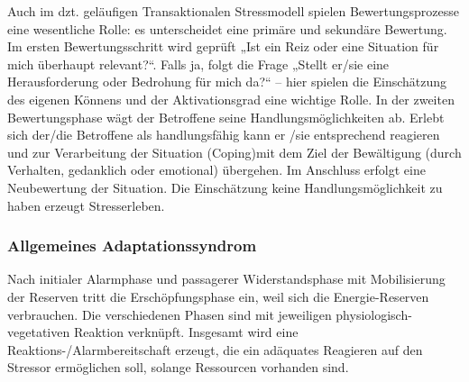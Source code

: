 Auch im dzt. geläufigen Transaktionalen Stressmodell spielen Bewertungsprozesse eine wesentliche Rolle: es unterscheidet eine primäre und sekundäre Bewertung. Im ersten Bewertungsschritt wird geprüft „Ist ein Reiz oder eine  Situation für mich überhaupt relevant?“. Falls ja, folgt die Frage „Stellt er/sie eine Herausforderung oder Bedrohung für mich da?“ – hier spielen die Einschätzung des eigenen Könnens und der Aktivationsgrad eine wichtige Rolle. In der zweiten Bewertungsphase wägt der Betroffene seine Handlungsmöglichkeiten ab. Erlebt sich der/die Betroffene als handlungsfähig kann er /sie entsprechend reagieren und zur Verarbeitung der Situation (Coping)mit dem Ziel der Bewältigung (durch Verhalten, gedanklich oder emotional) übergehen. Im Anschluss erfolgt eine Neubewertung der Situation. Die Einschätzung keine Handlungsmöglichkeit zu haben erzeugt Stresserleben. 
 
\subsubsection{Allgemeines Adaptationssyndrom}

Nach initialer Alarmphase und passagerer
Widerstandsphase mit Mobilisierung der Reserven tritt die
Erschöpfungsphase ein, weil sich die Energie-Reserven
verbrauchen. Die verschiedenen Phasen sind mit jeweiligen
physiologisch-vegetativen Reaktion verknüpft. Insgesamt wird
eine Reaktions-/Alarmbereitschaft erzeugt, die ein adäquates
Reagieren auf den Stressor ermöglichen soll, solange
Ressourcen vorhanden sind. 

